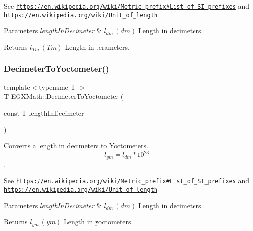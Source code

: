 See \href{https://en.wikipedia.org/wiki/Metric_prefix#List_of_SI_prefixes}{\tt https\+://en.\+wikipedia.\+org/wiki/\+Metric\+\_\+prefix\#\+List\+\_\+of\+\_\+\+S\+I\+\_\+prefixes} and \href{https://en.wikipedia.org/wiki/Unit_of_length}{\tt https\+://en.\+wikipedia.\+org/wiki/\+Unit\+\_\+of\+\_\+length} 
\begin{DoxyParams}{Parameters}
{\em length\+In\+Decimeter} & $ l_{dm}\ (dm)$ Length in decimeters. \\
\hline
\end{DoxyParams}
\begin{DoxyReturn}{Returns}
$ l_{Tm}\ (Tm)$ Length in terameters. 
\end{DoxyReturn}
\mbox{\label{group___e_g_x_math-_conversions-_length_conversions-_decimeter-_s_i_ga9da3b12a8bfe244f7af0cc13cf0de4a8}} 
\subsubsection{\texorpdfstring{Decimeter\+To\+Yoctometer()}{DecimeterToYoctometer()}}
{\footnotesize\ttfamily template$<$typename T $>$ \\
T E\+G\+X\+Math\+::\+Decimeter\+To\+Yoctometer (\begin{DoxyParamCaption}\item[{const T}]{length\+In\+Decimeter }\end{DoxyParamCaption})}



Converts a length in decimeters to Yoctometers. \[ l_{ym}=l_{dm} * 10^{23} \]. 

See \href{https://en.wikipedia.org/wiki/Metric_prefix#List_of_SI_prefixes}{\tt https\+://en.\+wikipedia.\+org/wiki/\+Metric\+\_\+prefix\#\+List\+\_\+of\+\_\+\+S\+I\+\_\+prefixes} and \href{https://en.wikipedia.org/wiki/Unit_of_length}{\tt https\+://en.\+wikipedia.\+org/wiki/\+Unit\+\_\+of\+\_\+length} 
\begin{DoxyParams}{Parameters}
{\em length\+In\+Decimeter} & $ l_{dm}\ (dm)$ Length in decimeters. \\
\hline
\end{DoxyParams}
\begin{DoxyReturn}{Returns}
$ l_{ym}\ (ym)$ Length in yoctometers. 
\end{DoxyReturn}
\mbox{\label{group___e_g_x_math-_conversions-_length_conversions-_decimeter-_s_i_ga47bb0274bb352706479e9f103686669b}} 
